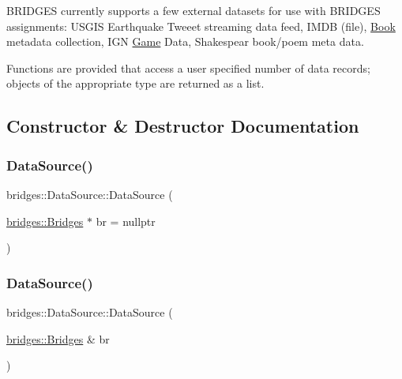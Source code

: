 B\+R\+I\+D\+G\+ES currently supports a few external datasets for use with B\+R\+I\+D\+G\+ES assignments\+: U\+S\+G\+IS Earthquake Tweeet streaming data feed, I\+M\+DB (file), \mbox{\hyperlink{classbridges_1_1_book}{Book}} metadata collection, I\+GN \mbox{\hyperlink{classbridges_1_1_game}{Game}} Data, Shakespear book/poem meta data.

Functions are provided that access a user specified number of data records; objects of the appropriate type are returned as a list. 

\subsection{Constructor \& Destructor Documentation}
\mbox{\label{classbridges_1_1_data_source_afc95b52d2ca03a92c1f1ee1594a097c7}} 
\subsubsection{\texorpdfstring{DataSource()}{DataSource()}\hspace{0.1cm}{\footnotesize\ttfamily [1/2]}}
{\footnotesize\ttfamily bridges\+::\+Data\+Source\+::\+Data\+Source (\begin{DoxyParamCaption}\item[{\mbox{\hyperlink{classbridges_1_1_bridges}{bridges\+::\+Bridges}} $\ast$}]{br = {\ttfamily nullptr} }\end{DoxyParamCaption})\hspace{0.3cm}{\ttfamily [inline]}}

\mbox{\label{classbridges_1_1_data_source_a0da0dc59d798aa3266df7931a396a4c9}} 
\subsubsection{\texorpdfstring{DataSource()}{DataSource()}\hspace{0.1cm}{\footnotesize\ttfamily [2/2]}}
{\footnotesize\ttfamily bridges\+::\+Data\+Source\+::\+Data\+Source (\begin{DoxyParamCaption}\item[{\mbox{\hyperlink{classbridges_1_1_bridges}{bridges\+::\+Bridges}} \&}]{br }\end{DoxyParamCaption})\hspace{0.3cm}{\ttfamily [inline]}}



